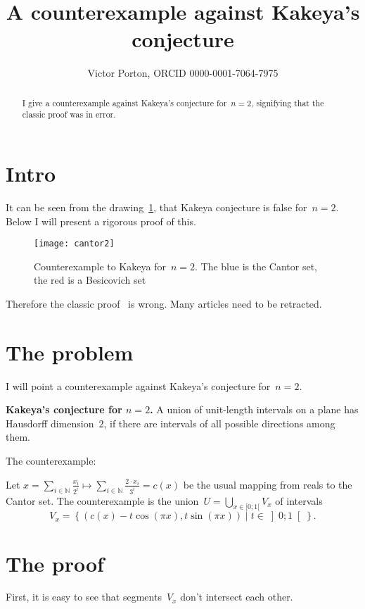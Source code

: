\documentclass[oneside,draft]{amsart}
\title{A counterexample against Kakeya's conjecture}
\author{Victor Porton, ORCID 0000-0001-7064-7975}
\newcommand{\setcond}[2]{\left\{#1\mid#2\right\}}
\begin{document}
\begin{abstract}
I give a counterexample against Kakeya's conjecture for~$n=2$, signifying that the classic proof was in error.
\end{abstract}

\maketitle  

\section{Intro}

It can be seen from the drawing~\ref{fig:example}, that Kakeya conjecture is false for~$n=2$. Below I will present a rigorous proof of this.

\begin{figure}[hbt]
    \centering
    \texttt{[image: cantor2]}
    \caption{Counterexample to Kakeya for~$n=2$. The blue is the Cantor set, the red is a Besicovich set}
    \label{fig:example}
\end{figure}

Therefore the classic proof~\cite{kakeya2d} is wrong. Many articles need to be retracted.

\section{The problem}

I will point a counterexample against Kakeya's conjecture for~$n=2$.

\textbf{Kakeya's conjecture for $n=2$.} A union of unit-length intervals on a plane has Hausdorff dimension~$2$, if there are intervals of all possible directions among them.

The counterexample:

Let $x = \sum_{i\in\mathbb{N}} \frac{x_i}{2^i} \mapsto \sum_{i\in\mathbb{N}} \frac{2\cdot x_i}{3^i} = c(x)$ be the usual mapping from reals to the Cantor set.
The counterexample is the union~$U=\bigcup_{x\in[0;1[}V_x$ of intervals \[ V_x = \setcond{(c(x)-t\cos(\pi x), t\sin(\pi x))}{t\in\left]0;1\right[}. \]

\section{The proof}

First, it is easy to see that segments~$V_x$ don't intersect each other.
\end{document}
